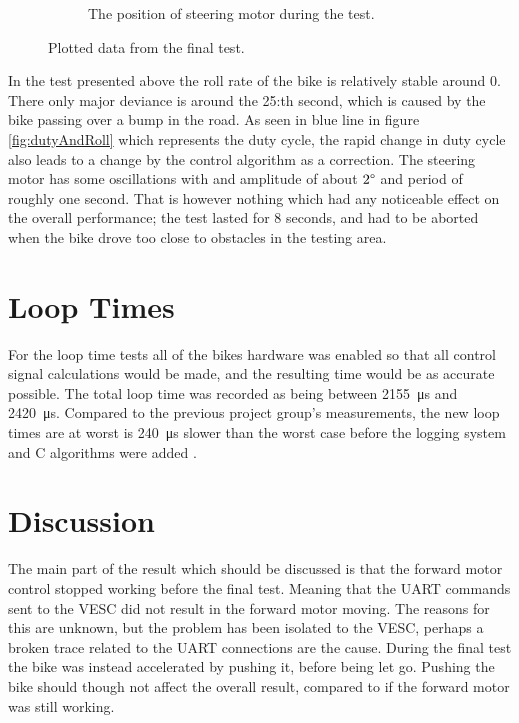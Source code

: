\begin{figure}[H]
\begin{subfigure}{.5\textwidth}
        \caption{The position of steering motor during the test.}
        \label{fig:motorPosition}
    \end{subfigure}
\caption{Plotted data from the final test.}
\label{fig:finalTest}
\end{figure}

In the test presented above the roll rate of the bike is relatively stable around 0. There only major deviance is around the 25:th second, which is caused by the bike passing over a bump in the road. As seen in blue line in figure \ref{fig:dutyAndRoll} which represents the duty cycle, the rapid change in duty cycle also leads to a change by the control algorithm as a correction. The steering motor has some oscillations with and amplitude of about $2\degree$ and period of roughly one second. That is however nothing which had any noticeable effect on the overall performance; the test lasted for 8 seconds, and had to be aborted when the bike drove too close to obstacles in the testing area.

\section{Loop Times}

For the loop time tests all of the bikes hardware was enabled so that all control signal calculations would be made, and the resulting time would be as accurate possible. The total loop time was recorded as being between \SI{2155}{\micro\second} and \SI{2420}{\micro\second}. Compared to the previous project group's measurements, the new loop times are at worst is \SI{240}{\micro\second} slower than the worst case before the logging system and C algorithms were added \cite{AronssonKarlsson2022PROJECTAUTOBIKE}.

\section{Discussion} \label{results:discussion}

The main part of the result which should be discussed is that the forward motor control stopped working before the final test. Meaning that the UART commands sent to the VESC did not result in the forward motor moving. The reasons for this are unknown, but the problem has been isolated to the VESC, perhaps a broken trace related to the UART connections are the cause. During the final test the bike was instead accelerated by pushing it, before being let go. Pushing the bike should though not affect the overall result, compared to if the forward motor was still working.

